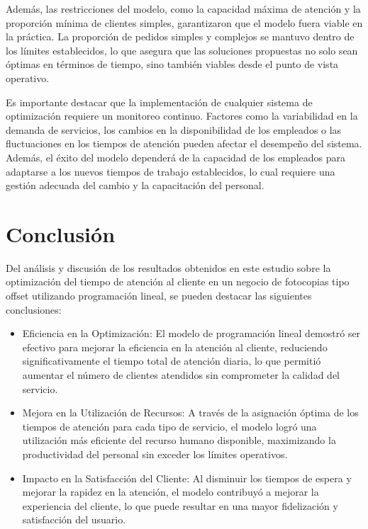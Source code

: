 \documentclass[12pt]{article}
\begin{document}
Además, las restricciones del modelo, como la capacidad máxima de atención y la proporción mínima de clientes simples, garantizaron que el modelo fuera viable en la práctica. La proporción de pedidos simples y complejos se mantuvo dentro de los límites establecidos, lo que asegura que las soluciones propuestas no solo sean óptimas en términos de tiempo, sino también viables desde el punto de vista operativo.

Es importante destacar que la implementación de cualquier sistema de optimización requiere un monitoreo continuo. Factores como la variabilidad en la demanda de servicios, los cambios en la disponibilidad de los empleados o las fluctuaciones en los tiempos de atención pueden afectar el desempeño del sistema. Además, el éxito del modelo dependerá de la capacidad de los empleados para adaptarse a los nuevos tiempos de trabajo establecidos, lo cual requiere una gestión adecuada del cambio y la capacitación del personal.

\newpage
\section{Conclusión}
Del análisis y discusión de los resultados obtenidos en este estudio sobre la optimización del tiempo de atención al cliente en un negocio de fotocopias tipo offset utilizando programación lineal, se pueden destacar las siguientes conclusiones:
\begin{itemize}
   

  \item Eficiencia en la Optimización: El modelo de programación lineal demostró ser efectivo para mejorar la eficiencia en la atención al cliente, reduciendo significativamente el tiempo total de atención diaria, lo que permitió aumentar el número de clientes atendidos sin comprometer la calidad del servicio.

  \item Mejora en la Utilización de Recursos: A través de la asignación óptima de los tiempos de atención para cada tipo de servicio, el modelo logró una utilización más eficiente del recurso humano disponible, maximizando la productividad del personal sin exceder los límites operativos.

  \item Impacto en la Satisfacción del Cliente: Al disminuir los tiempos de espera y mejorar la rapidez en la atención, el modelo contribuyó a mejorar la experiencia del cliente, lo que puede resultar en una mayor fidelización y satisfacción del usuario.
  \end{itemize}
  
\end{document}
